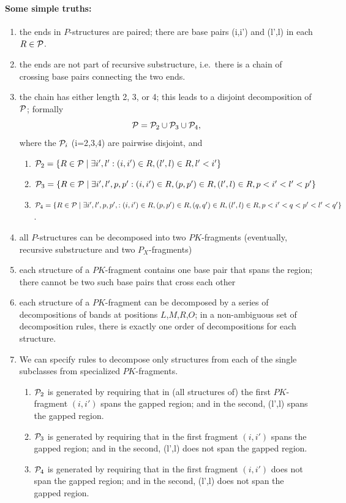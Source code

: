 \documentclass[11pt]{article} %
\newcommand{\PXnone}{P_{X}}
\begin{document}
\paragraph{Some simple truths:}
\begin{enumerate}
\item the ends in $P$-structures are paired; there are base pairs (i,i') and (l',l) in each $R\in \P$.
\item the ends are not part of recursive substructure, i.e.\ there is a chain of crossing base pairs connecting the two ends.
\item the chain has either length 2, 3, or 4; this leads to a disjoint decomposition of $\P$; formally
$$\P = \P_2 \cup \P_3 \cup \P_4,$$
where the $\P_i$ (i=2,3,4) are pairwise disjoint, and 
\begin{enumerate}
\item $\P_2 = \{R\in \P \mid \exists i',l': (i,i')\in R, (l',l)\in R, l'<i'\}$
\item $\P_3 = \{R\in \P \mid \exists i',l',p,p': (i,i')\in R, (p,p')\in R, (l',l)\in R, p<i'<l'<p'\}$ 
\item $\P_4 = \{R\in \P \mid \exists i',l',p,p',: (i,i')\in R, (p,p')\in R, (q,q')\in R, (l',l)\in R, p<i'<q<p'<l'<q'\}$.
\end{enumerate}
\item all $P$-structures can be decomposed into two $PK$-fragments (eventually, recursive substructure and two $\PXnone$-fragments)
\item each structure of a $PK$-fragment contains one base pair that spans the region; there cannot be two such base pairs that cross each other
\item each structure of a $PK$-fragment can be decomposed by a series of decompositions of bands at positions $L$,$M$,$R$,$O$; in a non-ambiguous set of decomposition rules, there is exactly one order of decompositions for each structure.
\item We can specify rules to decompose only structures from each of the single subclasses from specialized $PK$-fragments.
\begin{enumerate}
\item $\P_2$ is generated by requiring that in (all structures of) the first $PK$-fragment $(i,i')$ spans the gapped region; and in the second, (l',l) spans the gapped region.
\item $\P_3$ is generated by requiring that in the first fragment $(i,i')$ spans the gapped region; and in the second, (l',l) does not span the gapped region.
\item $\P_4$ is generated by requiring that in the first fragment $(i,i')$ does not span the gapped region; and in the second, (l',l) does not span the gapped region.
\end{enumerate}
\end{enumerate}
\end{document}

